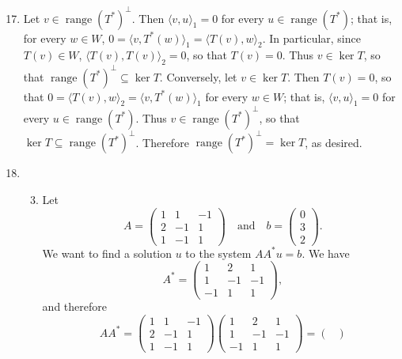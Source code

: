 \documentclass[12pt]{article}
\DeclareMathOperator{\range}{range}
\begin{document}
\begin{enumerate}
\setcounter{enumi}{16}
\item
Let $v \in \range(T^*)^\bot$. Then $\langle v, u \rangle_1 = 0$ for every $u \in \range(T^*)$; that is, for every $w \in W$, $0 = \langle v, T^*(w) \rangle_1 = \langle T(v), w \rangle_2$. In particular, since $T(v) \in W$, $\langle T(v), T(v) \rangle_2 = 0$, so that $T(v) = 0$. Thus $v \in \ker T$, so that $\range(T^*)^\bot \subseteq \ker T$. Conversely, let $v \in \ker T$. Then $T(v) = 0$, so that $0 = \langle T(v), w \rangle_2 = \langle v, T^*(w) \rangle_1$ for every $w \in W$; that is, $\langle v, u \rangle_1 = 0$ for every $u \in \range(T^*)$. Thus $v \in \range(T^*)^\bot$, so that $\ker T \subseteq \range(T^*)^\bot$. Therefore $\range(T^*)^\bot = \ker T$, as desired.

\setcounter{enumi}{21}
\item
\begin{enumerate}
\setcounter{enumii}{2}
\item
Let
\begin{equation*}
A = \begin{pmatrix}
1 & 1 & -1 \\
2 & -1 & 1 \\
1 & -1 & 1
\end{pmatrix} \quad \text{and} \quad
b = \begin{pmatrix}
0 \\
3 \\
2
\end{pmatrix}.
\end{equation*}
We want to find a solution $u$ to the system $AA^*u = b$. We have
\begin{equation*}
A^* = \begin{pmatrix}
1 & 2 & 1 \\
1 & -1 & -1 \\
-1 & 1 & 1
\end{pmatrix},
\end{equation*}
and therefore
\begin{equation*}
AA^* = \begin{pmatrix}
1 & 1 & -1 \\
2 & -1 & 1 \\
1 & -1 & 1
\end{pmatrix}
\begin{pmatrix}
1 & 2 & 1 \\
1 & -1 & -1 \\
-1 & 1 & 1
\end{pmatrix}
= \begin{pmatrix}

\end{pmatrix}
\end{equation*}
\end{enumerate}
\end{enumerate}
\end{document}
